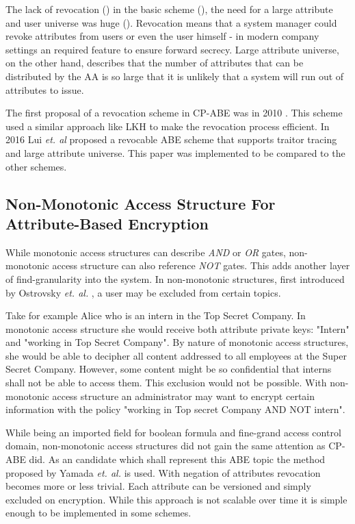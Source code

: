 The lack of revocation () in the basic scheme (\cite{bethencourt2007ciphertext}), the need for a large attribute and user universe was huge (). Revocation means that a system manager could revoke attributes from users or even the user himself - in modern company settings an required feature to ensure forward secrecy. Large attribute universe, on the other hand, describes that the number of attributes that can be distributed by the \ac{AA} is so large that it is unlikely that a system will run out of attributes to issue. 

The first proposal of a revocation scheme in \ac{CP-ABE} was in 2010 \cite{liang2010ciphertext}. This scheme used a similar approach like \ac{LKH} to make the revocation process efficient. In 2016 Lui \textit{et. al} \cite{liu2016practical} proposed a revocable \ac{ABE} scheme that supports traitor tracing and large attribute universe. This paper was implemented to be compared to the other schemes.

\subsection{Non-Monotonic Access Structure For Attribute-Based Encryption}
While monotonic access structures can describe \textit{AND} or \textit{OR} gates, non-monotonic access structure can also reference \textit{NOT} gates. This adds another layer of find-granularity into the system. In non-monotonic structures, first introduced by Ostrovsky \textit{et. al.} \cite{Ostrovsky:2007:AEN:1315245.1315270}, a user may be excluded from certain topics. 

Take for example Alice who is an intern in the Top Secret Company. In monotonic access structure she would receive both attribute private keys: "Intern" and "working in Top Secret Company". By nature of monotonic access structures, she would be able to decipher all content addressed to all employees at the Super Secret Company. However, some content might be so confidential that interns shall not be able to access them. This exclusion would not be possible. With non-monotonic access structure an administrator may want to encrypt certain information with the policy "working in Top secret Company AND NOT intern".  

While being an imported field for boolean formula and fine-grand access control domain, non-monotonic access structures did not gain the same attention as \ac{CP-ABE} did. As an candidate which shall represent this \ac{ABE} topic the method proposed by Yamada \textit{et. al.} \cite{10.1007/978-3-642-54631-0_16} is used. With negation of attributes revocation becomes more or less trivial. Each attribute can be versioned and simply excluded on encryption. While this approach is not scalable over time it is simple enough to be implemented in some schemes.   


